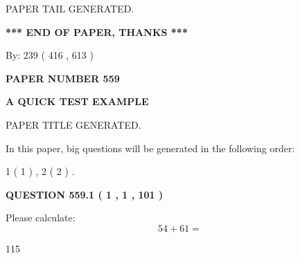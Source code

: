 \documentclass[12pt]{article}
\begin{document}
\vspace{2.0in} PAPER TAIL GENERATED.
   
   
   
   
\vspace{1.0in} 
{\textbf{\large{ *** END OF PAPER, THANKS *** }}} 
   
   
\hspace{1.0in} By: 
 239 ( 416 ,  613 )
   
   
   
   
\newpage 
\setcounter{page}{ 
   559001 } 
   
   
   
   
 {\textbf{ \Large{ PAPER NUMBER  559  }}}
   
   
\vspace{0.2in}
   
   
   
   
   
   
   
   
 \vspace{0.2in}
{\LARGE {\textbf{ A QUICK TEST EXAMPLE}}}
   
   
 PAPER TITLE GENERATED.
   
   
   
\vspace{0.2in}
   
In this paper, big questions will be generated in the following order: 
   
   
   1 ( 1 )
 ,
   2 ( 2 )
 .
  
\vspace{0.2in}
  
{\textbf{\Large{QUESTION
559.1 
 ( 1 , 1 , 101 )
}}}
  
  
 
Please calculate:
\begin{equation}
54 +  %
61 = \nonumber
\end{equation}
 
 
 
\noindent{}
 
 

115
 
 
\noindent{}
 
 

 
 
\end{document}
